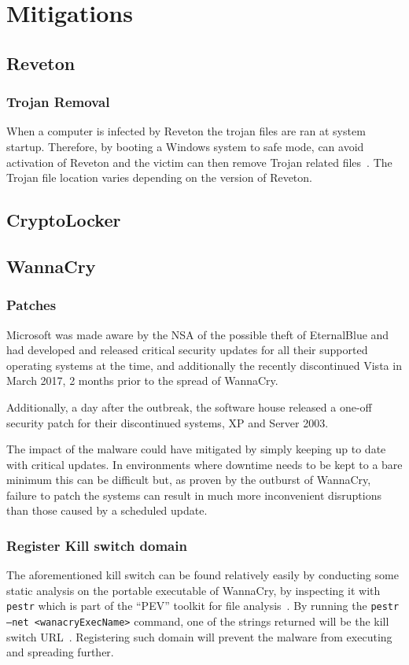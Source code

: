 \documentclass[10pt,a4paper]{article}
\begin{document}
\section{Mitigations} \label{sec:mitigations}

\subsection{Reveton}

\subsubsection{Trojan Removal}
When a computer is infected by Reveton the trojan files are ran at system startup. Therefore, by booting a Windows system to safe mode, can avoid activation of Reveton and the victim can then remove Trojan related files~\cite{revetonremoval}. The Trojan file location varies depending on the version of Reveton.

\subsection{CryptoLocker}

\subsection{WannaCry}

\subsubsection{Patches}
Microsoft was made aware by the NSA of the possible theft of EternalBlue and had developed and released critical security updates for all their supported operating systems at the time, and additionally the recently discontinued Vista in March 2017, 2 months prior to the spread of WannaCry.

Additionally, a day after the outbreak, the software house released a one-off security patch for their discontinued systems, XP and Server 2003.

The impact of the malware could have mitigated by simply keeping up to date with critical updates. In environments where downtime needs to be kept to a bare minimum this can be difficult but, as proven by the outburst of WannaCry, failure to patch the systems can result in much more inconvenient disruptions than those caused by a scheduled update.

\subsubsection{Register Kill switch domain}
The aforementioned kill switch can be found relatively easily by conducting some static analysis on the portable executable of WannaCry, by inspecting it with \texttt{pestr} which is part of the ``PEV'' toolkit for file analysis~\cite{PEtoolkit}. By running the \texttt{pestr --net <wanacryExecName>} command, one of the strings returned will be the kill switch URL~\cite{pestrVideo}. Registering such domain will prevent the malware from executing and spreading further.
\end{document}

